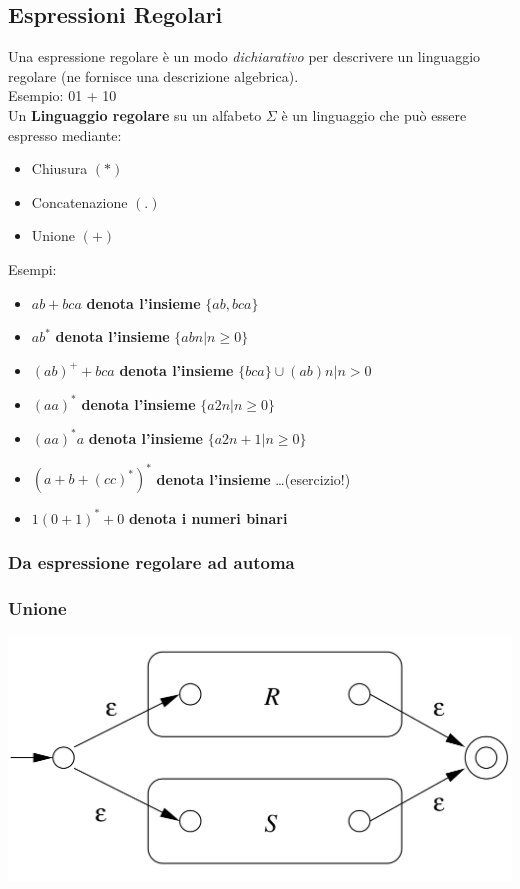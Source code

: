 \documentclass[12pt]{article}
\begin{document}
\subsection{Espressioni Regolari}
Una espressione regolare è un modo \textit{dichiarativo} per descrivere un  linguaggio regolare (ne fornisce una descrizione algebrica).\\
Esempio: 01 + 10\\
Un \textbf{Linguaggio regolare} su un alfabeto $\Sigma$ è un linguaggio che può essere espresso mediante:
\begin{itemize}
    \item Chiusura $(*)$
    \item Concatenazione $(.)$
    \item Unione $(+)$
\end{itemize}
Esempi:
\begin{itemize}
    \item $ab+bca$ \textbf{denota l'insieme} $\{ab, bca\}$  
    \item $ab^*$  \textbf{denota l'insieme} $\{abn | n \ge 0\}$ 
    \item $(ab)^++bca$ \textbf{denota l'insieme} $\{bca\} \cup {(ab)n | n > 0}$  
    \item $(aa)^*$ \textbf{denota l'insieme} $\{a2n |  n \ge 0\}$
    \item $(aa)^*a$ \textbf{denota l'insieme} $\{a2n+1 | n \ge 0\}$
    \item $(a+b+(cc)^*)^*$ \textbf{denota l'insieme} \dots (esercizio!) 
    \item $1(0+1)^*+0$ \textbf{denota i numeri binari}
\end{itemize} 

\subsubsection{Da espressione regolare ad automa}
\subsubsection*{Unione}
\includegraphics[scale=0.07]{assets/unione.png}
\end{document}
